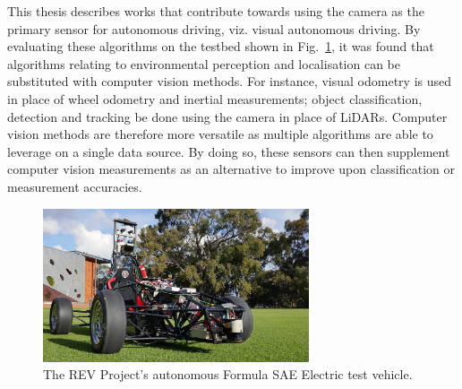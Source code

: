This thesis describes works that contribute towards using the camera as the primary sensor for autonomous driving, viz. visual autonomous driving. By evaluating these algorithms on the testbed shown in Fig.~\ref{fig:1:sae}, it was found that algorithms relating to environmental perception and localisation can be substituted with computer vision methods. For instance, visual odometry is used in place of wheel odometry and inertial measurements; object classification, detection and tracking be done using the camera in place of LiDARs. Computer vision methods are therefore more versatile as multiple algorithms are able to leverage on a single data source. By doing so, these sensors can then supplement computer vision measurements as an alternative to improve upon classification or measurement accuracies. 

\begin{figure}[ht] 
	\centering    
	\includegraphics[width=0.7\textwidth]{sae}
	\caption{The REV Project's autonomous Formula SAE Electric test vehicle.}
	\label{fig:1:sae}
\end{figure}



